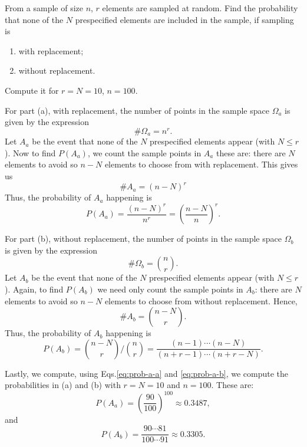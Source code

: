 \begin{problem}
  From a sample of size \(n\), \(r\) elements are sampled at random. Find
  the probability that none of the \(N\) prespecified elements are included
  in the sample, if sampling is
  \begin{enumerate}[label=(\alph*)]
  \item with replacement;
  \item without replacement.
  \end{enumerate}
  Compute it for \(r=N=10\), \(n=100\).
\end{problem}
\begin{solution}
  For part (a), with replacement, the number of points in the sample space
  \(\Omega_a\) is given by the expression
  \[
    \#\Omega_a=n^r.
  \]
  Let \(A_a\) be the event that none of the \(N\) prespecified elements
  appear (with \(N\leq r\)). Now to find \(P(A_a)\), we count the sample
  points in \(A_a\) these are: there are \(N\) elements to avoid so \(n-N\)
  elements to choose from with replacement. This gives us
  \[
    \# A_a=(n-N)^r
  \]
  Thus, the probability of \(A_a\) happening is
  \begin{equation}
    \label{eq:prob-a-a}
    P(A_a)=\frac{(n-N)^r}{n^r}=\left(\frac{n-N}{n}\right)^r.
  \end{equation}

  For part (b), without replacement, the number of points in the sample
  space \(\Omega_b\) is given by the expression
  \[
    \#\Omega_b=\binom{n}{r}.
  \]
  Let \(A_b\) be the event that none of the \(N\) prespecified elements
  appear (with \(N\leq r\)). Again, to find \(P(A_b)\) we need only count
  the sample points in \(A_b\): there are \(N\) elements to avoid so
  \(n-N\) elements to choose from without replacement. Hence,
  \[
    \# A_b=\binom{n-N}{r}.
  \]
  Thus, the probability of \(A_b\) happening is
  \begin{equation}
    \label{eq:prob-a-b}
    P(A_b)=%
    \binom{n-N}{r}\biggl/\binom{n}{r}=%
    \frac{(n-1)\dotsm (n-N)}{(n+r-1)\dotsm (n+r-N)}.
  \end{equation}

  Lastly, we compute, using Eqs.\@ \eqref{eq:prob-a-a} and
  \eqref{eq:prob-a-b}, we compute the probabilities in (a) and (b) with
  \(r=N=10\) and \(n=100\). These are:
  \[
    P(A_a)=\left(\frac{90}{100}\right)^{100}\approx 0.3487,
  \]
  and
  \[
    P(A_b)=\frac{90\dotsm 81}{100\dotsm 91}\approx 0.3305.
  \]
\end{solution}
\newpage

